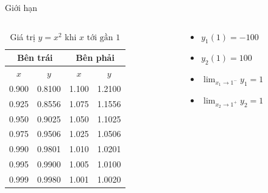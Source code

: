 \begin{frame}{Giới hạn}
    \begin{columns}
        \begin{column}{0.5\textwidth}
            \begin{table}[H]
        \centering
        \caption{Giá trị \( y = x^2 \) khi \( x \text{~tới gần } 1 \)}
        \begin{tabular}{|c|c||c|c|}
        \hline
        \multicolumn{2}{|c||}{Bên trái} & \multicolumn{2}{c|}{Bên phải} \\
        \hline
        \( x \) & \( y \) & \( x \) & \( y \) \\
        \hline
        0.900 & 0.8100 & 1.100 & 1.2100 \\
        0.925 & 0.8556 & 1.075 & 1.1556 \\
        0.950 & 0.9025 & 1.050 & 1.1025 \\
        0.975 & 0.9506 & 1.025 & 1.0506 \\
        0.990 & 0.9801 & 1.010 & 1.0201 \\
        0.995 & 0.9900 & 1.005 & 1.0100 \\
        0.999 & 0.9980 & 1.001 & 1.0020 \\
        \hline
        \end{tabular}
    \end{table}
        \end{column}
        \begin{column}{0.5\textwidth}
            \begin{itemize}
            \item \(y_1(1)=-100\)  
            \item \(y_2(1)=100\)
            \item \(\lim_{x_1 \to 1^{-}} y_1 = 1\)
            \item \(\lim_{x_2 \to 1^{+}} y_2 = 1\)
            \end{itemize}
        \end{column}
    \end{columns}
\end{frame}
